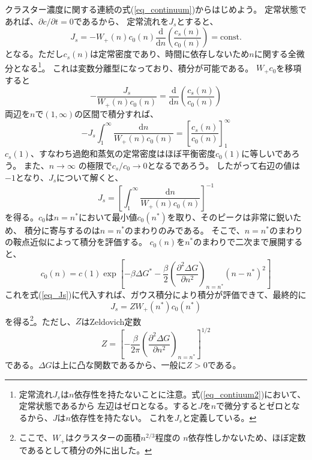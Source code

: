 \documentclass{jarticle}
\newcommand{\diff}{\mathrm d}
\begin{document}
クラスター濃度に関する連続の式(\ref{eq_continuum})からはじめよう。
定常状態であれば、$\partial c/\partial t = 0$であるから、
定常流れを$J_s$とすると、
\begin{equation}
    J_s = - W_+ (n) c_0(n) \frac{\diff}{\diff n}\left( \frac{c_s(n)}{c_0(n)} \right)= \mbox{const.}
\end{equation}
となる。ただし$c_s(n)$は定常密度であり、時間に依存しないため$n$に関する全微分となる\footnote{
    定常流れ$J_s$は$n$依存性を持たないことに注意。式(\ref{eq_contiuum2})において、定常状態であるから
    左辺はゼロとなる。すると$J$を$n$で微分するとゼロとなるから、$J$は$n$依存性を持たない。
    これを$J_s$と定義している。
}。
これは変数分離型になっており、積分が可能である。
$W_+ c_0$を移項すると
\begin{equation}
    -\frac{J_s}{W_+(n) c_0(n)} = \frac{\diff }{\diff n } \left(\frac{c_s(n)}{c_0(n)} \right)
\end{equation}
両辺を$n$で$(1,\infty)$の区間で積分すれば、
\begin{equation}
    -J_s \int_1^{\infty} \frac{\diff n}{W_+(n) c_0(n)}  =  \left[ \frac{c_s(n)}{c_0(n)} \right]_1^\infty
\end{equation}
$c_s(1)$、すなわち過飽和蒸気の定常密度はほぼ平衡密度$c_0(1)$に等しいであろう。
また、$n \rightarrow \infty$ の極限で$c_s/c_0 \rightarrow 0$となるであろう。
したがって右辺の値は$-1$となり、$J_s$について解くと、
\begin{equation}
    J_s = \left[ \int_1^\infty \frac{\diff n}{W_+(n) c_0(n)} \right]^{-1} \label{eq_Js}
\end{equation}
を得る。$c_0$は$n=n^*$において最小値$c_0(n^*)$を取り、そのピークは非常に鋭いため、
積分に寄与するのは$n=n^*$のまわりのみである。
そこで、$n=n^*$のまわりの鞍点近似によって積分を評価する。
$c_0(n)$を$n^*$のまわりで二次まで展開すると、
$$
    c_0(n) = c(1) \exp\left[
        - \beta \Delta G^*
        -\frac{\beta}{2} \left(
        \frac{\partial^2 \Delta G}{\partial n^2}
        \right)_{n=n^*} (n-n^*)^2
        \right]
$$
これを式(\ref{eq_Js})に代入すれば、ガウス積分により積分が評価できて、最終的に
\begin{equation}
    J_s = Z W_+(n^*) c_0(n^*)
\end{equation}
を得る\footnote{ここで、$W_+$はクラスターの面積$n^{2/3}$程度の
    $n$依存性しかないため、ほぼ定数であるとして積分の外に出した。
}。ただし、$Z$はZeldovich定数
\begin{equation}
    Z = \left[-
        \frac{\beta}{2\pi}
        \left(
        \frac{\partial^2 \Delta G}{\partial n^2}
        \right)_{n=n^*}
        \right]^{1/2}
\end{equation}
である。$\Delta G$は上に凸な関数であるから、一般に$Z>0$である。
\end{document}
